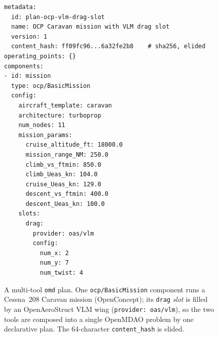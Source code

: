 %

\begin{figure}[t]
\centering
\begin{lstlisting}[style=planyaml]
metadata:
  id: plan-ocp-vlm-drag-slot
  name: OCP Caravan mission with VLM drag slot
  version: 1
  content_hash: ff09fc96...6a32fe2b8    # sha256, elided
operating_points: {}
components:
- id: mission
  type: ocp/BasicMission
  config:
    aircraft_template: caravan
    architecture: turboprop
    num_nodes: 11
    mission_params:
      cruise_altitude_ft: 18000.0
      mission_range_NM: 250.0
      climb_vs_ftmin: 850.0
      climb_Ueas_kn: 104.0
      cruise_Ueas_kn: 129.0
      descent_vs_ftmin: 400.0
      descent_Ueas_kn: 100.0
    slots:
      drag:
        provider: oas/vlm
        config:
          num_x: 2
          num_y: 7
          num_twist: 4
\end{lstlisting}
\caption{A multi-tool \texttt{omd} plan. One \texttt{ocp/BasicMission} component
runs a Cessna~208 Caravan mission (OpenConcept); its \texttt{drag} \emph{slot}
is filled by an OpenAeroStruct VLM wing (\texttt{provider: oas/vlm}), so the two
tools are composed into a single OpenMDAO problem by one declarative plan. The
64-character \texttt{content\_hash} is elided.}
\label{fig:ocp-oas-plan}
\end{figure}
